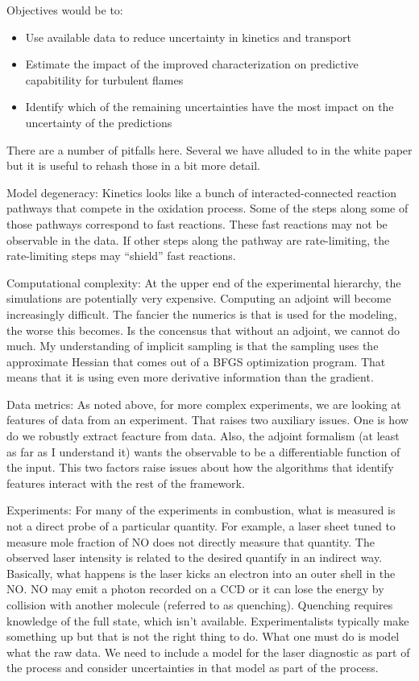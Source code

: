 \documentclass[11pt]{article}
\begin{document}
Objectives would be to:
\begin{itemize}
\item Use available data to reduce uncertainty in kinetics and transport
\item Estimate the impact of the improved characterization on predictive capabitility for turbulent flames
\item Identify which of the remaining uncertainties have the most impact on the uncertainty of the predictions
\end{itemize}

There are a number of pitfalls here.  Several we have alluded to in the white paper but it is useful to rehash those 
in a bit more detail.

Model degeneracy:  Kinetics looks like a bunch of interacted-connected reaction pathways that compete in the oxidation
process.  Some of the steps along some of those pathways correspond to fast reactions.  These fast reactions may not
be observable in the data. If other steps along the pathway are rate-limiting, the rate-limiting steps may ``shield'' 
fast reactions.

Computational complexity:  At the upper end of the experimental hierarchy, the simulations are potentially very expensive.
Computing an adjoint will become increasingly difficult. The fancier the numerics is that
is used for the modeling, the worse this becomes.  Is the concensus that without an adjoint, we cannot do
much.  My understanding of implicit sampling is that the sampling uses the approximate Hessian that comes out
of a BFGS optimization program.  That means that it is using even more derivative information than the gradient.

Data metrics:  As noted above, for more complex experiments,
we are looking at features of data from an experiment.  That raises two auxiliary
issues.  One is how do we robustly extract feacture from data.
Also, the adjoint formalism (at least as far as I understand it) wants the observable
to be a differentiable function of the input.  
This two factors raise issues about how the algorithms that identify features interact with
the rest of the framework.

Experiments:  For many of the experiments in combustion, what is measured is not a direct probe of a particular quantity.
For example, a laser sheet tuned to measure mole fraction of NO does not directly measure that quantity.  The observed
laser intensity is related to the desired quantify in an indirect way.  Basically, what happens is the laser kicks an
electron into an outer shell in the NO. NO may emit a photon recorded on a CCD or it can lose the energy by collision
with another molecule (referred to as quenching).  Quenching requires knowledge of the full state, which isn't available.
Experimentalists typically make something up but that is not the right thing to do.  What one must do is model
what the raw data.  We need to include a model for the laser diagnostic as part of the process and consider
uncertainties in that model as part of the process.
\end{document}
